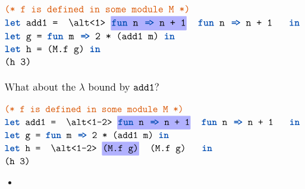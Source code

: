 \begin{frame}

  \Large
  \vspace{1em}

  \[
  \Large
  \begin{array}{@{}ll@{}}
    \mex{\color{dkcomment}{(* f is defined in some module M *)}} \\
    \mex{\kw{let} add1 = \altcolor{1}{blue}{\kw{fun} n \codearr n + 1} \kw{in}} \\
    \mex{\kw{let} g = \kw{fun} m \codearr 2 * (add1 m) \kw{in}} \\
    \mex{\kw{let} h = (M.f g) \kw{in}} \\
    \mex{(h 3)} \\
    \\
    \text{What about the \lam\ bound by \mex{add1}?}
  \end{array}
  \]

\end{frame}

\begin{frame}

  \Large
  \[
  \Large
  \begin{array}{@{}ll@{}}
    \mex{\color{dkcomment}{(* f is defined in some module M *)}} \\
    \mex{\kw{let} add1 = \altcolor{1-2}{blue}{\kw{fun} n \codearr n + 1} \kw{in}} \\
    \mex{\kw{let} g = \kw{fun} m \codearr 2 * (add1 m) \kw{in}} \\
    \mex{\kw{let} h = \altcolor{1-2}{blue}{(M.f g)} \kw{in}} \\
    \mex{(h 3)}
  \end{array}
  \]

  \begin{itemize}
  \item {}
  \end{itemize}


\end{frame}

